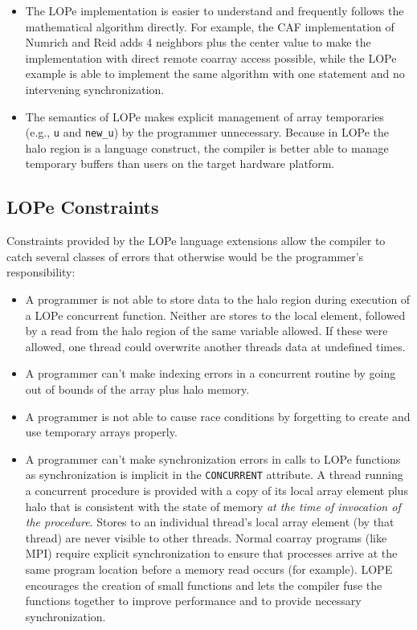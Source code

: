 \begin{itemize}
\item
The LOPe implementation is easier to understand and frequently follows the mathematical algorithm
directly.  For example, the CAF implementation of Numrich and Reid adds 4 neighbors plus the center
value to make the implementation with direct remote coarray access possible, while the LOPe example
is able to implement the same algorithm with one statement and no intervening synchronization.

\item
The semantics of LOPe makes explicit management of array temporaries (e.g., \texttt{u} and
\texttt{new\_u}) by the programmer unnecessary.
Because in LOPe the
halo region is a language construct, the compiler is better able to manage temporary
buffers than users on the target hardware platform.

\end{itemize}

\subsection{LOPe Constraints}

Constraints provided by the LOPe language extensions allow the compiler to catch several classes of
errors that otherwise would be the programmer's responsibility:

\begin{itemize}

\item
A programmer is not able to store data to the halo region during execution of a LOPe concurrent
function.  Neither are stores to the local element, followed by a read from the halo region of the
same variable allowed.  If these were allowed, one thread could overwrite another threads data at
undefined times.

\item
A programmer can't make indexing errors in a concurrent routine by going out of bounds of the array
plus halo memory.

\item
A programmer is not able to cause race conditions by forgetting to create and use temporary arrays
properly.

\item
A programmer can't make synchronization errors in calls to LOPe functions as synchronization is
implicit in the \texttt{CONCURRENT} attribute.  A thread running a concurrent procedure is provided
with a copy of its local array element plus halo that is consistent with the state of memory
\emph{at the time of invocation of the procedure}.  Stores to an individual thread's local array
element (by that thread) are never visible to other threads.  Normal coarray programs (like MPI)
require explicit synchronization to ensure that processes arrive at the same program location
before a memory read occurs (for example).  LOPE encourages the creation of small functions and
lets the compiler fuse the functions together to improve performance and to provide necessary
synchronization.

\end{itemize}
